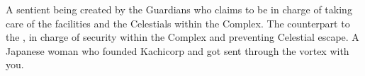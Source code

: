 \documentclass[char]{guardians}
\begin{document}
\begin{contacts}
   A sentient being created by the Guardians who claims to be in charge of taking care of the facilities and the Celestials within the Complex.
   The counterpart to the \cCaretaker{}, in charge of security within the Complex and preventing Celestial escape.
  \contact{\cKachiko{}} A Japanese woman who founded Kachicorp and got sent through the vortex with you.
\end{contacts}
\end{document}
